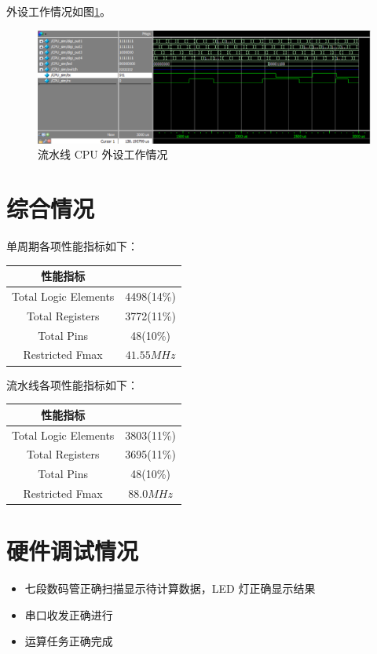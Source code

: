 \documentclass{ctexart}
\begin{document}
	外设工作情况如图\ref{simpicture13}。

	\begin{figure}[ht]
		\centering
		\includegraphics[width = \textwidth]{PipelineTestWave6.eps}
		\caption{流水线 CPU 外设工作情况}
		\label{simpicture13}
	\end{figure}	

	\section{综合情况}
	单周期各项性能指标如下：
	\begin{center}
		\begin{tabular}{|c|c|}
		\hline
		性能指标 & \\
		\hline
		Total Logic Elements & 4498(14\%) \\
		Total Registers & 3772(11\%) \\
		Total Pins & 48(10\%) \\
		Restricted Fmax & $41.55 MHz$ \\  
		\hline
		\end{tabular}
	\end{center}
	
	流水线各项性能指标如下：
	\begin{center}
		\begin{tabular}{|c|c|}
		\hline
		性能指标 & \\
		\hline
		Total Logic Elements & 3803(11\%) \\
		Total Registers & 3695(11\%) \\
		Total Pins & 48(10\%) \\
		Restricted Fmax & $88.0 MHz$ \\  
		\hline
		\end{tabular}
	\end{center}
	\section{硬件调试情况}
\begin{itemize}
	\item  七段数码管正确扫描显示待计算数据，LED 灯正确显示结果
	\item  串口收发正确进行
	\item  运算任务正确完成 
\end{itemize}
\end{document}
